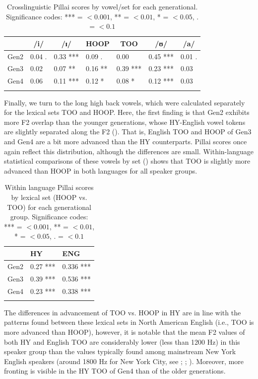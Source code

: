 \documentclass[output=paper]{langsci/langscibook}
\begin{document}
\begin{table}
\begin{tabular}{*{7}{l}} 
\lsptoprule
& \multicolumn{1}{c}{/i/} & \multicolumn{1}{c}{/ɪ/} &  \multicolumn{1}{c}{HOOP} &  \multicolumn{1}{c}{TOO} &  \multicolumn{1}{c}{/ʊ/} &  \multicolumn{1}{c}{/a/} \\
\midrule
Gen2 & 0.04 . & 0.33 *** & 0.09 . & 0.00  & 0.45 *** & 0.01 .\\
Gen3 & 0.02 & 0.07 ** & 0.16 ** & 0.39 *** & 0.23 *** & 0.03  \\
Gen4 & 0.06  & 0.11 *** & 0.12 * & 0.08 * & 0.12 *** & 0.03  \\
\lspbottomrule
\end{tabular}
\caption{Crosslinguistic Pillai scores by vowel/set for each generational. Significance codes: *** = $<0.001$, ** = $<0.01$, * = $<0.05$, . = $<0.1$}\label{tab:nove:4}
\end{table}

Finally, we turn to the long high back vowels, which were calculated separately for the lexical sets TOO and HOOP. Here, the first finding is that Gen2 exhibits more F2 overlap than the younger generations, whose HY-English vowel tokens are slightly separated along the F2 (). That is, English TOO and HOOP of Gen3 and Gen4 are a bit more advanced than the HY counterparts. Pillai scores once again reflect this distribution, although the differences are small. Within-language statistical comparisons of these vowels by set () shows that TOO is slightly more advanced than HOOP in both languages for all speaker groups.

\begin{table}
\begin{tabular}{lll}
\lsptoprule 
 & {HY} & {ENG} \\
\midrule
Gen2 & 0.27 *** & 0.336 ***\\
Gen3 & 0.39 {***} & 0.536 {***}\\
Gen4 & 0.23 {***} & 0.338 {***}\\
\lspbottomrule
\end{tabular}
\caption{Within language Pillai scores by lexical set (HOOP vs. TOO) for each generational group. Significance codes: *** = $<0.001$, ** = $<0.01$, * = $<0.05$, . = $<0.1$}
\label{tab:nove:5}
\end{table}

The differences in advancement of TOO vs. HOOP in HY are in line with the patterns found between these lexical sets in North American English (i.e., TOO is more advanced than HOOP), however, it is notable that the mean F2 values of both HY and English TOO are considerably lower (less than 1200 Hz) in this speaker group than the values typically found among mainstream New York English speakers (around 1800 Hz for New York City, see \citealt{Newman2014}; \citealt{Wong2014}; \citealt{HaddicanEtAl2019}). Moreover, more fronting is visible in the HY TOO of Gen4 than of the older generations.
\end{document}
